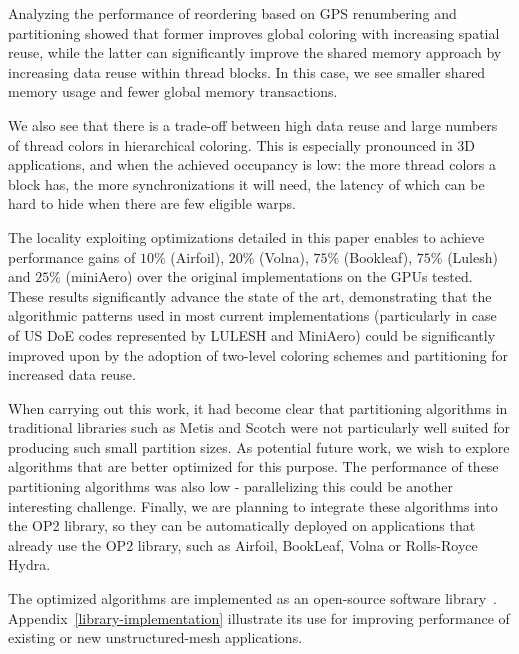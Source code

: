 \documentclass[number]{elsarticle}
\begin{document}
Analyzing the performance of reordering based on GPS renumbering and 
partitioning showed that former improves global coloring with increasing 
spatial reuse, while the latter can significantly improve the shared memory 
approach by increasing data reuse within thread blocks. In this case, we 
see smaller shared memory usage and fewer global memory transactions.

We also see that there is a trade-off between high data reuse and large numbers 
of thread colors in hierarchical coloring. This is especially pronounced in 3D 
applications, and when the achieved occupancy is low: the more thread colors a 
block has, the more synchronizations it will need, the latency of which can be 
hard to hide when there are few eligible warps.

The locality exploiting optimizations detailed in this paper enables to 
achieve performance gains of $10\%$ (Airfoil), $20\%$ (Volna), $75\%$ 
(Bookleaf), $75\%$ (Lulesh) and $25\%$ (miniAero) over the original 
implementations on the GPUs tested. These results significantly advance the 
state of the art, demonstrating that the algorithmic patterns used in most 
current implementations (particularly in case of US DoE codes represented by 
LULESH and MiniAero) could be significantly improved upon by the adoption of 
two-level coloring schemes and partitioning for increased data reuse.

When carrying out this work, it had become clear that partitioning algorithms in
traditional libraries such as Metis and Scotch were not particularly well suited
for producing such small partition sizes. As potential future work, we wish to
explore algorithms that are better optimized for this purpose. The performance
of these partitioning algorithms was also low - parallelizing this could be
another interesting challenge. Finally, we are planning to integrate these
algorithms into the OP2 library, so they can be automatically deployed on
applications that already use the OP2 library, such as Airfoil, BookLeaf, Volna
or Rolls-Royce Hydra.

The optimized algorithms are implemented as an open-source software 
library~\cite{library}. Appendix~\ref{library-implementation} illustrate its 
use for improving performance of existing or new unstructured-mesh applications.


\end{document}
